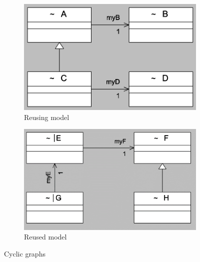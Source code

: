 \begin{figure}
	\centering
    \begin{subfigure}[b]{0.4\linewidth}
    	\includegraphics[width=\linewidth]{cyclicm1.PNG}
        \caption{Reusing model}
        \label{figure : cyclic1}
    \end{subfigure}
    \begin{subfigure}[b]{0.4\linewidth}
    	\includegraphics[width=\linewidth]{cycllic2_update.png}
        \caption{Reused model}
        \label{figure : cyclic2}
    \end{subfigure}
	\caption{Cyclic graphs}
    \label{figure : cyclicgraph}
\end{figure}
